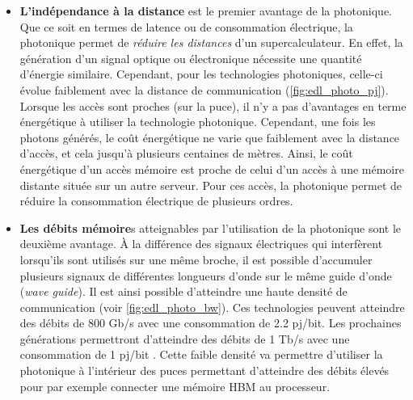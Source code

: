         \begin{itemize}
            \item \textbf{L'indépendance à la distance} est le premier avantage de la photonique. Que ce soit en termes de latence ou de consommation électrique, la photonique permet de \textit{réduire les distances} d'un supercalculateur. En effet, la génération d'un signal optique ou électronique nécessite une quantité d'énergie similaire. Cependant, pour les technologies photoniques, celle-ci évolue faiblement avec la distance de communication (\autoref{fig:edl_photo_pj}). Lorsque les accès sont proches (sur la puce), il n'y a pas d'avantages en terme énergétique à utiliser la technologie photonique. Cependant, une fois les photons générés, le coût énergétique ne varie que faiblement avec la distance d'accès, et cela jusqu'à plusieurs centaines de mètres. Ainsi, le coût énergétique d'un accès mémoire est proche de celui d'un accès à une mémoire distante située sur un autre serveur. Pour ces accès, la photonique permet de réduire la consommation électrique de plusieurs ordres. 
    
            \item \textbf{Les débits mémoire}s atteignables par l'utilisation de la photonique sont le deuxième avantage. À la différence des signaux électriques qui interfèrent lorsqu’ils sont utilisés sur une même broche, il est possible d’accumuler plusieurs signaux de différentes longueurs d’onde sur le même guide d’onde (\textit{wave guide}). Il est ainsi possible d'atteindre une haute densité de communication (voir \autoref{fig:edl_photo_bw}). Ces technologies peuvent atteindre des débits de 800 Gb/s avec une consommation de 2.2 pj/bit. Les prochaines générations permettront d'atteindre des débits de 1 Tb/s  avec une consommation de 1 pj/bit \cite{Bergman2018}. Cette faible densité va permettre d'utiliser la photonique à l'intérieur des puces permettant d'atteindre des débits élevés pour par exemple connecter une mémoire HBM au processeur.
        \end{itemize}
        
